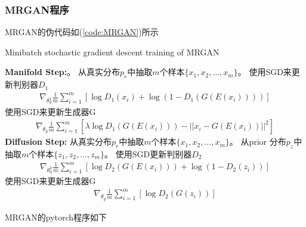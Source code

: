         \subsubsection{MRGAN程序}
            \par
            MRGAN的伪代码如(\ref{code:MRGAN})所示
            \begin{algorithm}[htbp]
                \caption{Minibatch stochastic gradient descent training of MRGAN}\label{code:MRGAN}
                \begin{algorithmic}[1]
                    \State \textbf{Manifold Step:}。
                    \State 从真实分布$p_r$中抽取$m$个样本$\{x_1,x_2,\dots,x_m\}$。
                    \State 使用SGD来更新判别器$D_1$
                    \begin{align*}
                    \nabla_{\theta_d^1} \frac{1}{m} \sum_{i=1}^m [\log D_1(x_i)+\log (1-D_1(G(E(x_i))))]
                    \end{align*}
                    \State 使用SGD来更新生成器G
                    \begin{align*}
                    \nabla _{\theta_g} \frac{1}{m}\sum_{i=1}^m [\lambda\log D_1(G(E(x_i))) - ||x_i - G(E(x_i))||^2]
                    \end{align*}
                    \State \textbf{Diffusion Step:}
                    \State 从真实分布$p_r$中抽取$m$个样本$\{x_1,x_2,\dots,x_m\}$。
                    \State 从prior 分布$p_z$中抽取$m$个样本$\{z_1,z_2,\dots,z_m\}$。
                    \State 使用SGD更新判别器$D_2$
                    \begin{align*}
                    \nabla_{\theta_d^2}\frac{1}{m}\sum_{i=1}^m [\log D_2(G(E(x_i)))+\log (1-D_2(z_i))]
                    \end{align*}
                    \State 使用SGD来更新生成器G
                    \begin{align*}
                    \nabla_{\theta_g} \frac{1}{m}\sum_{i=1}^m[\log D_2(G(z_i))]
                    \end{align*}
                \end{algorithmic}
            \end{algorithm}
            \par
            MRGAN的pytorch程序如下
